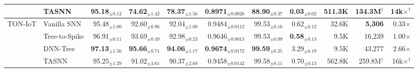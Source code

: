 \begin{table}[!ht]
{\begin{tabular}{l l r r r r r r r r r}
& TASNN         & 95.18$_{\pm0.12}$ & 74.62$_{\pm1.42}$ & 78.37$_{\pm1.56}$ & 0.8971$_{\pm0.0026}$ & 88.90$_{\pm0.37}$ & 0.03$_{\pm0.02}$ & 511.3K & 134.3M$^\dagger$ & 14k$\times$$^\dagger$ \\
\midrule
\multirow{4}{*}{TON-IoT}
& Vanilla SNN   & 95.48$_{\pm1.00}$ & 92.60$_{\pm0.96}$ & 92.04$_{\pm1.00}$ & 0.9484$_{\pm0.0112}$ & 99.53$_{\pm0.16}$ & 0.62$_{\pm0.12}$ & 32.6K & \cellcolor{bestcell}\textbf{5,306} & 0.33$\times$ \\
& Tree-to-Spike & 96.91$_{\pm0.11}$ & 93.69$_{\pm0.49}$ & 92.98$_{\pm0.23}$ & 0.9646$_{\pm0.0013}$ & 99.53$_{\pm0.09}$ & \cellcolor{bestcell}\textbf{0.58$_{\pm0.13}$} & 9.5K & 16,239 & 1.00$\times$ \\
& DNN-Tree      & \cellcolor{bestcell}\textbf{97.13$_{\pm1.56}$} & \cellcolor{bestcell}\textbf{95.66$_{\pm0.71}$} & \cellcolor{bestcell}\textbf{94.06$_{\pm1.17}$} & \cellcolor{bestcell}\textbf{0.9674$_{\pm0.0172}$} & \cellcolor{bestcell}\textbf{99.59$_{\pm0.25}$} & 3.29$_{\pm6.19}$ & 9.5K & 43,277 & 2.66$\times$ \\
& TASNN         & 95.25$_{\pm1.29}$ & 91.02$_{\pm3.61}$ & 90.37$_{\pm2.68}$ & 0.9458$_{\pm0.0142}$ & 99.58$_{\pm0.11}$ & 0.70$_{\pm0.13}$ & 562.8K & 259.8M$^\dagger$ & 16k$\times$$^\dagger$ \\
\bottomrule
\end{tabular}}
\end{table}
